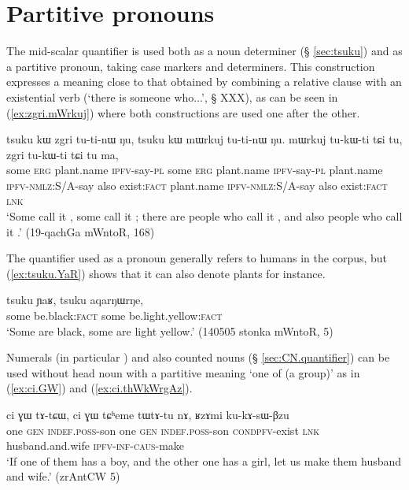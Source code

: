 \section{Partitive pronouns} \label{sec:partitive.pronouns}
The mid-scalar quantifier  is used both as a noun determiner (§ \ref{sec:tsuku}) and as a partitive pronoun, taking case markers and determiners. This construction expresses a meaning close to that obtained by combining a relative clause with an existential verb (`there is someone who...', § XXX), as can be seen in (\ref{ex:zgri.mWrkuj}) where both constructions are used one after the other. 

\begin{exe}
\ex \label{ex:zgri.mWrkuj}
\gll tsuku kɯ zgri tu-ti-nɯ ŋu, tsuku kɯ mɯrkuj tu-ti-nɯ ŋu. mɯrkuj tu-kɯ-ti tɕi tu, zgri tu-kɯ-ti tɕi tu ma, \\
some \textsc{erg} plant.name \textsc{ipfv}-say-\textsc{pl} some \textsc{erg} plant.name \textsc{ipfv}-say-\textsc{pl} plant.name  \textsc{ipfv}-\textsc{nmlz}:S/A-say also exist:\textsc{fact} plant.name  \textsc{ipfv}-\textsc{nmlz}:S/A-say also exist:\textsc{fact}  \textsc{lnk} \\
\glt  `Some call it , some call it ; there are people who call it , and also people who call it .' (19-qachGa mWntoR, 168)
\end{exe}
 
The quantifier  used as a pronoun generally refers to humans in the corpus, but (\ref{ex:tsuku.YaR}) shows that it can also denote plants for instance. 

\begin{exe}
\ex \label{ex:tsuku.YaR}
\gll tsuku ɲaʁ, tsuku aqarŋɯrŋe, \\
some be.black:\textsc{fact} some be.light.yellow:\textsc{fact} \\
\glt `Some are black, some are light yellow.' (140505 stonka mWntoR, 5)
\end{exe}

Numerals (in particular ) and also counted nouns (§ \ref{sec:CN.quantifier}) can be used without head noun with a partitive meaning `one of (a group)' as in (\ref{ex:ci.GW})  and (\ref{ex:ci.thWkWrgAz}).

\begin{exe}
\ex \label{ex:ci.GW}
\gll ci ɣɯ 	tɤ-tɕɯ,  ci ɣɯ tɕʰeme tɯ\redp{}tɤ-tu nɤ, ʁzɤmi ku-kɤ-sɯ-βzu \\
one \textsc{gen} \textsc{indef}.\textsc{poss}-son one \textsc{gen} \textsc{indef}.\textsc{poss}-son \textsc{cond}\redp{}\textsc{pfv}-exist \textsc{lnk} husband.and.wife \textsc{ipfv}-\textsc{inf}-\textsc{caus}-make \\
\glt `If one of them has a boy, and the other one has a girl, let us make them husband and wife.' (zrAntCW 5)
\end{exe}

